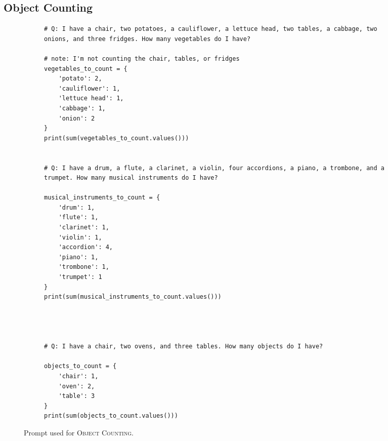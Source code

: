 \documentclass[dvipsnames]{article} \usepackage[accepted]{icml2022}
\newcommand{\objectcounting}{\textsc{Object Counting}\xspace}
\begin{document}
\subsection{Object Counting}
\begin{figure*}[!h]
\centering
\begin{subfigure}[t]{.95\textwidth}

 \begin{verbatim}
# Q: I have a chair, two potatoes, a cauliflower, a lettuce head, two tables, a cabbage, two onions, and three fridges. How many vegetables do I have?

# note: I'm not counting the chair, tables, or fridges
vegetables_to_count = {
    'potato': 2,
    'cauliflower': 1,
    'lettuce head': 1,
    'cabbage': 1,
    'onion': 2
}
print(sum(vegetables_to_count.values()))


# Q: I have a drum, a flute, a clarinet, a violin, four accordions, a piano, a trombone, and a trumpet. How many musical instruments do I have?

musical_instruments_to_count = {
    'drum': 1,
    'flute': 1,
    'clarinet': 1,
    'violin': 1,
    'accordion': 4,
    'piano': 1,
    'trombone': 1,
    'trumpet': 1
}
print(sum(musical_instruments_to_count.values()))




# Q: I have a chair, two ovens, and three tables. How many objects do I have?

objects_to_count = {
    'chair': 1,
    'oven': 2,
    'table': 3
}
print(sum(objects_to_count.values()))

\end{verbatim}
\label{appendix:fig:objectcounting:ours}
\end{subfigure}
\caption{Prompt used for \objectcounting.}
\end{figure*}




\newpage
\end{document}
